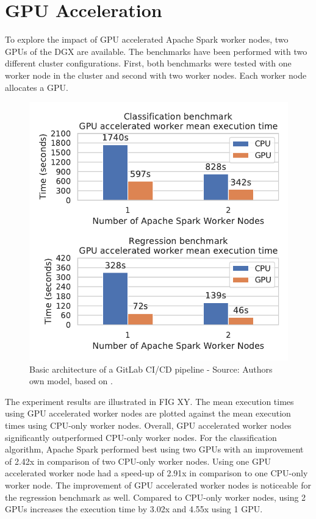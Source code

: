 \section{GPU Acceleration}
To explore the impact of GPU accelerated Apache Spark worker nodes, two GPUs of the DGX are available.
%
The benchmarks have been performed with two different cluster configurations. First, both benchmarks were tested with one worker node in the cluster and second with two worker nodes. Each worker node allocates a GPU.
\begin{figure}[h]
\centering
\includegraphics[scale=1]{images/07_evaluation/overall_cpu_vs_gpu}
\caption{Basic architecture of a GitLab CI/CD pipeline - Source: Authors own model, based on \cite{Gitlab2020Docs}.}
\label{fig:07_gpu_results}
\end{figure}
The experiment results are illustrated in FIG XY. 
The mean execution times using GPU accelerated worker nodes are plotted against the mean execution times using CPU-only worker nodes.
Overall, GPU accelerated worker nodes significantly outperformed CPU-only worker nodes.
For the classification algorithm, Apache Spark performed best using two GPUs with an improvement of 2.42x in comparison of two CPU-only worker nodes. Using one GPU accelerated worker node had a speed-up of 2.91x in comparison to one CPU-only worker node.
The improvement of GPU accelerated worker nodes is noticeable for the regression benchmark as well. Compared to CPU-only worker nodes, using 2 GPUs increases the execution time by 3.02x and 4.55x using 1 GPU.


